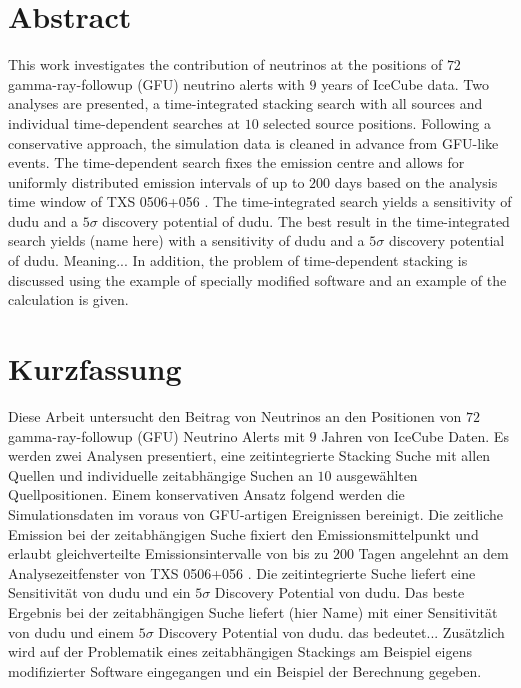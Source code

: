 \section*{Abstract}

This work investigates the contribution of neutrinos at the positions of $\num{72}$ gamma-ray-followup (GFU) neutrino alerts with $\num{9}$ years of IceCube data.
Two analyses are presented, a time-integrated stacking search with all sources and individual time-dependent searches at $\num{10}$ selected source positions.
Following a conservative approach, the simulation data is cleaned in advance from GFU-like events.
The time-dependent search fixes the emission centre and allows for uniformly distributed emission intervals of up to $\num{200}$ days based on the analysis time window of TXS 0506+056 \cite{txs}.
The time-integrated search yields a sensitivity of dudu and a $\num{5}\sigma$ discovery potential of dudu.
The best result in the time-integrated search yields (name here) with a sensitivity of dudu and a $\num{5}\sigma$ discovery potential of dudu.
Meaning...
In addition, the problem of time-dependent stacking is discussed using the example of specially modified software and an example of the calculation is given.

\section*{Kurzfassung}

Diese Arbeit untersucht den Beitrag von Neutrinos an den Positionen von $\num{72}$ gamma-ray-followup (GFU) Neutrino Alerts mit $\num{9}$ Jahren von IceCube Daten.
Es werden zwei Analysen presentiert, eine zeitintegrierte Stacking Suche mit allen Quellen und individuelle zeitabhängige Suchen an $\num{10}$ ausgewählten Quellpositionen.
Einem konservativen Ansatz folgend werden die Simulationsdaten im voraus von GFU-artigen Ereignissen bereinigt.
Die zeitliche Emission bei der zeitabhängigen Suche fixiert den Emissionsmittelpunkt und erlaubt gleichverteilte Emissionsintervalle von bis zu $\num{200}$ Tagen angelehnt an dem Analysezeitfenster von TXS 0506+056 \cite{txs}.
Die zeitintegrierte Suche liefert eine Sensitivität von dudu und ein $\num{5}\sigma$ Discovery Potential von dudu.
Das beste Ergebnis bei der zeitabhängigen Suche liefert (hier Name) mit einer Sensitivität von dudu und einem $\num{5}\sigma$ Discovery Potential von dudu.
das bedeutet...
Zusätzlich wird auf der Problematik eines zeitabhängigen Stackings am Beispiel eigens modifizierter Software eingegangen und ein Beispiel der Berechnung gegeben.
